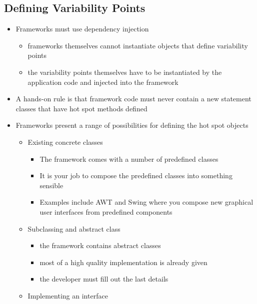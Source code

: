 \documentclass[11pt]{article}
\providecommand{\tightlist}{%
      \setlength{\itemsep}{0pt}\setlength{\parskip}{0pt}}
\begin{document}
\hypertarget{defining-variability-points}{%
\subsection{Defining Variability
Points}\label{defining-variability-points}}

\begin{itemize}
\item
  Frameworks must use dependency injection

  \begin{itemize}
  \tightlist
  \item
    frameworks themselves cannot instantiate objects that define
    variability points
  \item
    the variability points themselves have to be instantiated by the
    application code and injected into the framework
  \end{itemize}
\item
  A hands-on rule is that framework code must never contain a new
  statement classes that have hot spot methods defined
\item
  Frameworks present a range of possibilities for defining the hot spot
  objects

  \begin{itemize}
  \tightlist
  \item
    Existing concrete classes

    \begin{itemize}
    \tightlist
    \item
      The framework comes with a number of predefined classes
    \item
      It is your job to compose the predefined classes into something
      sensible
    \item
      Examples include AWT and Swing where you compose new graphical
      user interfaces from predefined components
    \end{itemize}
  \item
    Subclassing and abstract class

    \begin{itemize}
    \tightlist
    \item
      the framework contains abstract classes
    \item
      most of a high quality implementation is already given
    \item
      the developer must fill out the last details
    \end{itemize}
  \item
    Implementing an interface


\end{itemize}
\end{itemize}
\end{document}
